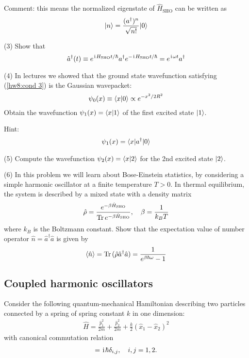 Comment: this means the normalized eigenstate of $\hat H_\text{SHO}$ can be written as
\begin{align}
|{n}\rangle=\frac{(a^\dagger)^n}{\sqrt{n!}}|{0}\rangle
\end{align}

(3) Show that 
\begin{align}
\hat a^\dagger(t)\equiv e^{\hspace{1pt}\mathrm{i}\hspace{1pt} H_\text{SHO}t/\hbar}a^\dagger e^{-\hspace{1pt}\mathrm{i}\hspace{1pt} H_\text{SHO}t/\hbar}=e^{\hspace{1pt}\mathrm{i}\hspace{1pt}\omega t}a^\dagger
\end{align}

(4) In lectures we showed that the ground state wavefunction satisfying (\ref{hw8:cond 3}) is the Gaussian wavepacket:
\begin{align}
\psi_0(x)\equiv\langle{x|0}\rangle\propto e^{-x^2/2R^2}
\end{align}
Obtain the wavefunction $\psi_1(x)=\langle{x|1}\rangle$ of the first excited state $|{1}\rangle$.

Hint:
\begin{align}
\psi_1(x)=\langle{x|a^\dagger|0}\rangle
\end{align}

(5) Compute the wavefunction $\psi_2(x)=\langle{x|2}\rangle$ for the 2nd excited state $|{2}\rangle$. 

(6) In this problem we will learn about Bose-Einstein statistics, by considering a simple harmonic oscillator at a finite temperature $T>0$. In thermal equilibrium, the system is described by a mixed state with a density matrix
\begin{align}
    \hat\rho=\frac{e^{-\beta\hat H_\text{SHO}}}{\operatorname{Tr}{e^{-\beta\hat H_\text{SHO}}}},~~~\beta=\frac1{k_BT}
\end{align}
where $k_B$ is the Boltzmann constant. Show that the expectation value of number operator $\hat n=\hat a^\dagger\hat a$ is given by
\begin{align}
    \langle{\hat n}\rangle=\operatorname{Tr}{(\hat\rho\hat a^\dagger\hat a)}=\frac1{e^{\beta\hbar\omega}-1}
\end{align}



\subsection{Coupled harmonic oscillators}

Consider the following quantum-mechanical Hamiltonian describing two particles connected by a spring of spring constant $k$ in one dimension:
\begin{align}\label{coupled harmonic oscillator}
\hat H=\frac{\hat p_1^2}{2m}+\frac{\hat p_2^2}{2m}+\frac{k}2(\hat x_1-\hat x_2)^2
\end{align}
with canonical commutation relation
\begin{align}
[\hat x_i,\hat p_j]=\imth\hbar\delta_{i,j},~~~i,j=1,2.
\end{align}

